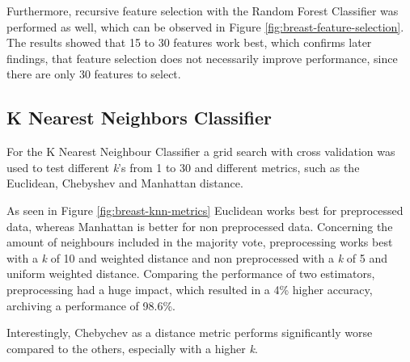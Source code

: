 


Furthermore, recursive feature selection with the Random Forest Classifier was performed as well, which can be observed in Figure \ref{fig:breast-feature-selection}. The results showed that 15 to 30 features work best, which confirms later findings, that feature selection does not necessarily improve performance, since there are only 30 features to select.


\subsection{K Nearest Neighbors Classifier}

For the K Nearest Neighbour Classifier a grid search with cross validation was used to test different \textit{k}'s from 1 to 30 and different metrics, such as the Euclidean, Chebyshev and Manhattan distance.

As seen in Figure \ref{fig:breast-knn-metrics} Euclidean works best for preprocessed data, whereas Manhattan is better for non preprocessed data.
Concerning the amount of neighbours included in the majority vote, preprocessing works best with a \textit{k} of 10 and weighted distance and non preprocessed with a \textit{k} of 5 and uniform weighted distance.
Comparing the performance of two estimators, preprocessing had a huge impact, which resulted in a 4\% higher accuracy, archiving a performance of 98.6\%.  

Interestingly, Chebychev as a distance metric performs significantly worse compared to the others, especially with a higher \textit{k}.

